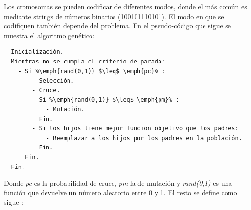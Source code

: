Los cromosomas se pueden codificar de diferentes modos, donde el más 
común es mediante strings de números binarios (100101110101). El modo en
que se codifiquen también depende del problema.
\newpage
En el pseudo-código que sigue se muestra el algoritmo genético\cite{DoGeGr2007}:

\begin{lstlisting}[float=!h, caption=Algoritmo Genético General\cite{GePo2010}, label=GA]
- Inicialización.
- Mientras no se cumpla el criterio de parada:
    - Si %\emph{rand(0,1)} $\leq$ \emph{pc}% :
        - Selección.
        - Cruce.
        - Si %\emph{rand(0,1)} $\leq$ \emph{pm}% :
            - Mutación.
          Fin.
        - Si los hijos tiene mejor función objetivo que los padres:
            - Reemplazar a los hijos por los padres en la población.
          Fin.
      Fin.
  Fin.
\end{lstlisting}

Donde \emph{pc} es la probabilidad de cruce, \emph{pm} la de mutación y
\emph{rand(0,1)} es una función que devuelve un número aleatorio entre 0 y 1.
El resto se define como sigue \cite{DoGeGr2007}:

